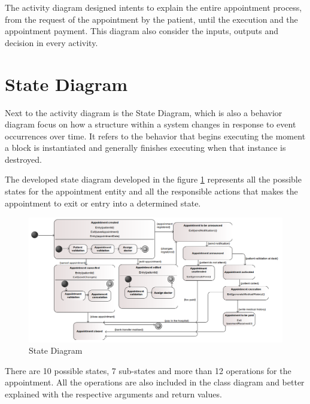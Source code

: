 \documentclass{article}
\begin{document}
            The activity diagram designed intents to explain the entire appointment process, from the request of the appointment by the patient, until the execution and the appointment payment. This 
            diagram also consider the inputs, outputs and decision in every activity.

            \section{State Diagram}
           
            Next to the activity diagram is the State Diagram, which is also a behavior
            diagram focus on how a structure within a system changes in response to event
            occurrences over time. It refers to the behavior that begins executing the moment a block
            is instantiated and generally finishes executing when that instance is destroyed.
            
            The developed state diagram developed in the figure \ref{fig:state} represents all the possible states for the appointment entity and all the responsible actions that makes the appointment to exit or entry into a 
            determined state.

            \begin{figure}[H]
                \centering 
                \includegraphics[width=.8\linewidth]{./img/state.png}
                \caption{State Diagram}
                \label{fig:state}
            \end{figure}
            
            There are 10 possible states, 7 sub-states and more than 12 operations for the appointment. All the operations are also included in the class diagram and  better explained with the respective arguments and return values.
            
        
            \newpage
            
            
            \nocite{*}
    
\end{document}
